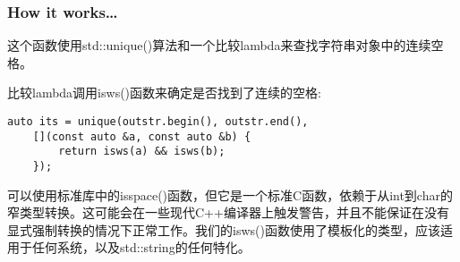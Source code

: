 \subsubsection{How it works…}

这个函数使用std::unique()算法和一个比较lambda来查找字符串对象中的连续空格。

比较lambda调用isws()函数来确定是否找到了连续的空格:

\begin{lstlisting}[style=styleCXX]
auto its = unique(outstr.begin(), outstr.end(),
	[](const auto &a, const auto &b) {
		return isws(a) && isws(b);
	});
\end{lstlisting}

可以使用标准库中的isspace()函数，但它是一个标准C函数，依赖于从int到char的窄类型转换。这可能会在一些现代C++编译器上触发警告，并且不能保证在没有显式强制转换的情况下正常工作。我们的isws()函数使用了模板化的类型，应该适用于任何系统，以及std::string的任何特化。



















